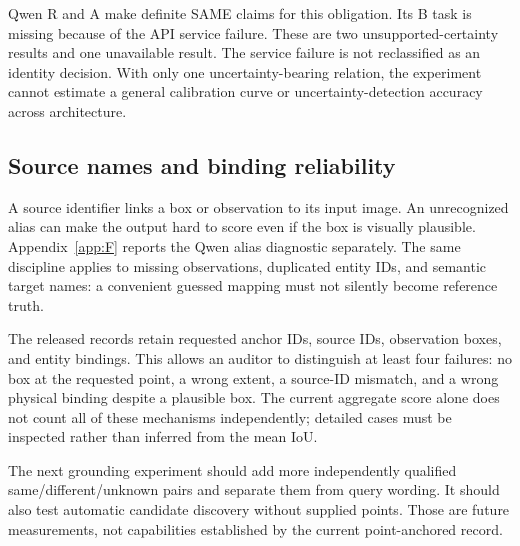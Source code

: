 Qwen R and A make definite SAME claims for this obligation. Its B task is missing because of the API service failure. These are two unsupported-certainty results and one unavailable result. The service failure is not reclassified as an identity decision. With only one uncertainty-bearing relation, the experiment cannot estimate a general calibration curve or uncertainty-detection accuracy across architecture.

\subsection{Source names and binding reliability}
A source identifier links a box or observation to its input image. An unrecognized alias can make the output hard to score even if the box is visually plausible. Appendix~\ref{app:F} reports the Qwen alias diagnostic separately. The same discipline applies to missing observations, duplicated entity IDs, and semantic target names: a convenient guessed mapping must not silently become reference truth.

The released records retain requested anchor IDs, source IDs, observation boxes, and entity bindings. This allows an auditor to distinguish at least four failures: no box at the requested point, a wrong extent, a source-ID mismatch, and a wrong physical binding despite a plausible box. The current aggregate score alone does not count all of these mechanisms independently; detailed cases must be inspected rather than inferred from the mean IoU.

The next grounding experiment should add more independently qualified same/different/unknown pairs and separate them from query wording. It should also test automatic candidate discovery without supplied points. Those are future measurements, not capabilities established by the current point-anchored record.
